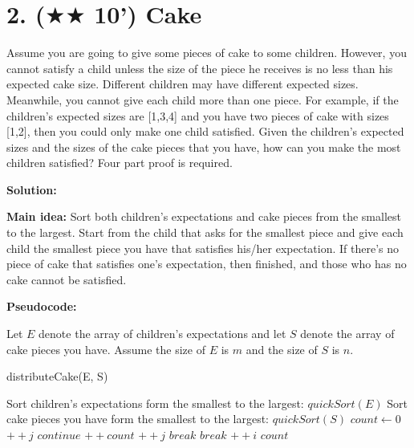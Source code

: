 \documentclass{article}
\begin{document}
\section*{2. ($\bigstar\bigstar$ 10') Cake}
Assume you are going to give some pieces of cake to some children.  
However, you cannot satisfy a child unless the size of the piece he receives is no less than his expected cake size.   
Different children may have different expected sizes. Meanwhile, you  cannot give each child more than one piece.
For example, if the children’s expected sizes are [1,3,4] and you have two pieces of cake with sizes [1,2], then you 
could only make one child satisfied.  Given the children’s expected sizes and the sizes of the cake pieces that you 
have, how can you make the most children satisfied?  Four part proof is required. 
{\color{blue}
\par\textbf{Solution: }
\par\textbf{Main idea: } Sort both children's expectations and cake pieces from the smallest to the largest. Start from the child that asks for the smallest piece and give each child the smallest piece you have that satisfies his/her expectation. If there's no piece of cake that satisfies one's expectation, then finished, and those who has no cake cannot be satisfied.\\

\par\textbf{Pseudocode: }
\par Let $E$ denote the array of children's expectations and let $S$ denote the array of cake pieces you have. Assume the size of $E$ is $m$ and the size of $S$ is $n$.
\begin{algorithm}
	\caption{distributeCake(E, S)}
	\label{alg2}
	\color{blue}
	\begin{algorithmic}
		\STATE Sort children's expectations form the smallest to the largest: $quickSort(E)$
		\STATE Sort cake pieces you have form the smallest to the largest: $quickSort(S)$
		\STATE $count \gets 0$
					\STATE $++j$
					\STATE $continue$
				\ELSE
					\STATE $++count$
					\STATE $++j$
					\STATE $break$
				\ENDIF
			\ENDWHILE
				\STATE $break$
			\ENDIF
			\STATE $++i$
		\ENDWHILE
		\RETURN $count$
	\end{algorithmic}
\end{algorithm}

}
\end{document}
